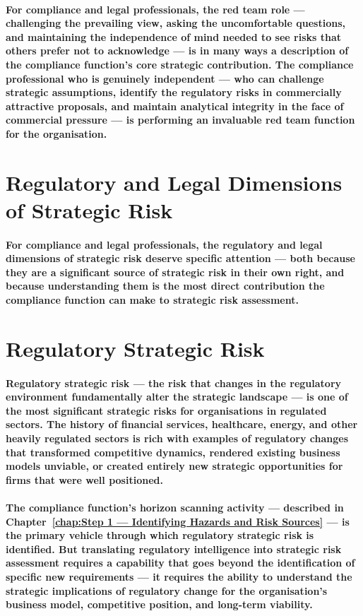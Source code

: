 \paragraph{For compliance and legal professionals, the red team role — challenging the prevailing view, asking the uncomfortable questions, and maintaining the independence of mind needed to see risks that others prefer not to acknowledge — is in many ways a description of the compliance function's core strategic contribution. The compliance professional who is genuinely independent — who can challenge strategic assumptions, identify the regulatory risks in commercially attractive proposals, and maintain analytical integrity in the face of commercial pressure — is performing an invaluable red team function for the organisation.}

\section{Regulatory and Legal Dimensions of Strategic Risk}
\paragraph{For compliance and legal professionals, the regulatory and legal dimensions of strategic risk deserve specific attention — both because they are a significant source of strategic risk in their own right, and because understanding them is the most direct contribution the compliance function can make to strategic risk assessment.}

\section{Regulatory Strategic Risk}
\paragraph{\textbf{Regulatory strategic risk} — the risk that changes in the regulatory environment fundamentally alter the strategic landscape — is one of the most significant strategic risks for organisations in regulated sectors. The history of financial services, healthcare, energy, and other heavily regulated sectors is rich with examples of regulatory changes that transformed competitive dynamics, rendered existing business models unviable, or created entirely new strategic opportunities for firms that were well positioned.}
\paragraph{The compliance function's horizon scanning activity — described in Chapter~\ref{chap:Step 1 — Identifying Hazards and Risk Sources} — is the primary vehicle through which regulatory strategic risk is identified. But translating regulatory intelligence into strategic risk assessment requires a capability that goes beyond the identification of specific new requirements — it requires the ability to understand the strategic implications of regulatory change for the organisation's business model, competitive position, and long-term viability.}
